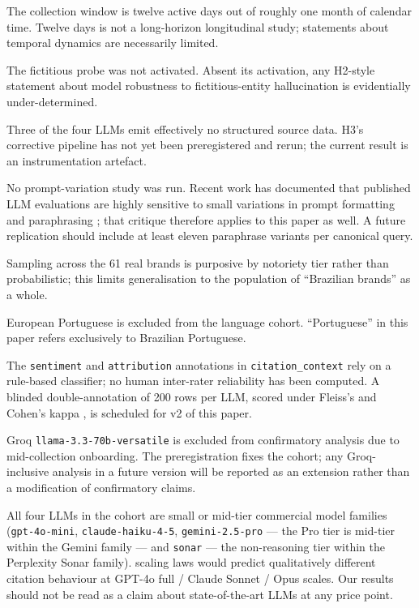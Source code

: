 \documentclass[preprint,12pt,authoryear]{elsarticle}
\begin{document}
\begin{description}[style=nextline,leftmargin=1em,itemsep=0.2em]
\item[(L1)] The collection window is twelve active days out of roughly one month of calendar time. Twelve days is not a long-horizon longitudinal study; statements about temporal dynamics are necessarily limited.
\item[(L2)] The fictitious probe was not activated. Absent its activation, any H2-style statement about model robustness to fictitious-entity hallucination is evidentially under-determined.
\item[(L3)] Three of the four LLMs emit effectively no structured source data. H3's corrective pipeline has not yet been preregistered and rerun; the current result is an instrumentation artefact.
\item[(L4)] No prompt-variation study was run. Recent work has documented that published LLM evaluations are highly sensitive to small variations in prompt formatting and paraphrasing \citep{Sclar2024}; that critique therefore applies to this paper as well. A future replication should include at least eleven paraphrase variants per canonical query.
\item[(L5)] Sampling across the 61 real brands is purposive by notoriety tier rather than probabilistic; this limits generalisation to the population of ``Brazilian brands'' as a whole.
\item[(L6)] European Portuguese is excluded from the language cohort. ``Portuguese'' in this paper refers exclusively to Brazilian Portuguese.
\item[(L7)] The \texttt{sentiment} and \texttt{attribution} annotations in \texttt{citation\_context} rely on a rule-based classifier; no human inter-rater reliability has been computed. A blinded double-annotation of 200 rows per LLM, scored under Fleiss's and Cohen's kappa \citep{Fleiss1971}, is scheduled for v2 of this paper.
\item[(L8)] Groq \texttt{llama-3.3-70b-versatile} is excluded from confirmatory analysis due to mid-collection onboarding. The preregistration fixes the cohort; any Groq-inclusive analysis in a future version will be reported as an extension rather than a modification of confirmatory claims.
\item[(L9)] All four LLMs in the cohort are small or mid-tier commercial model families (\texttt{gpt-4o-mini}, \texttt{claude-haiku-4-5}, \texttt{gemini-2.5-pro} --- the Pro tier is mid-tier within the Gemini family --- and \texttt{sonar} --- the non-reasoning tier within the Perplexity Sonar family). \citet{Kaplan2020} scaling laws would predict qualitatively different citation behaviour at GPT-4o full / Claude Sonnet / Opus scales. Our results should not be read as a claim about state-of-the-art LLMs at any price point.

\end{description}
\end{document}
